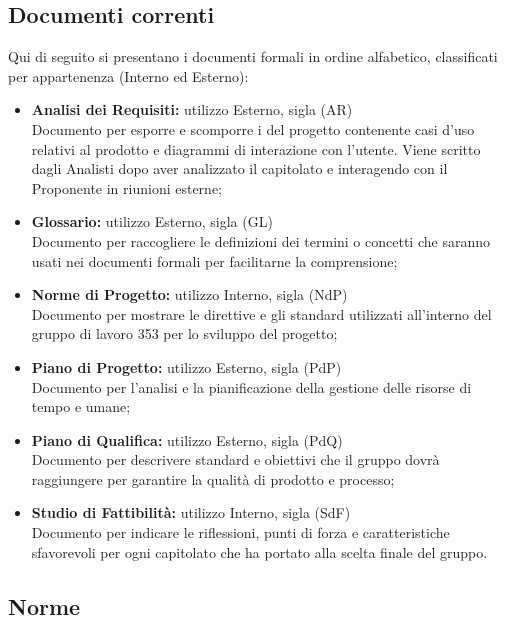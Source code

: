 \documentclass[NormeDiProgetto.tex]{subfiles}
\begin{document}
	\subsection{Documenti correnti}
	Qui di seguito si presentano i documenti formali in ordine alfabetico, classificati per appartenenza (Interno ed Esterno):
	\begin{itemize}
		\item \textbf{Analisi dei Requisiti:} utilizzo Esterno, sigla (AR) \\
		 Documento per esporre e scomporre i  del progetto contenente casi d'uso relativi al prodotto e diagrammi di interazione con l'utente. Viene scritto dagli Analisti dopo aver analizzato il capitolato e interagendo con il Proponente in riunioni esterne;
		
		\item \textbf{Glossario:}
		utilizzo Esterno, sigla (GL) \\
		Documento per raccogliere le definizioni dei termini o concetti che saranno usati nei documenti formali per facilitarne la comprensione;
		
		\item \textbf{Norme di Progetto:}
		utilizzo Interno, sigla (NdP) \\
		Documento per mostrare le direttive e gli standard utilizzati all'interno del gruppo di lavoro 353
		per lo sviluppo del progetto;
		
		\item \textbf{Piano di Progetto:}
		utilizzo Esterno, sigla (PdP) \\
		Documento per l'analisi e la pianificazione della gestione delle risorse di tempo e umane;
		
		\item \textbf{Piano di Qualifica:}
		utilizzo Esterno, sigla (PdQ) \\
		Documento per descrivere standard e obiettivi che il gruppo dovrà raggiungere per garantire la qualità di prodotto e processo;
		
		\item \textbf{Studio di Fattibilità:}
		utilizzo Interno, sigla (SdF) \\
		Documento per indicare le riflessioni, punti di forza e caratteristiche sfavorevoli per ogni capitolato che ha portato alla scelta finale del gruppo.
		
	\end{itemize}
	
	\subsection{Norme}
\end{document}
